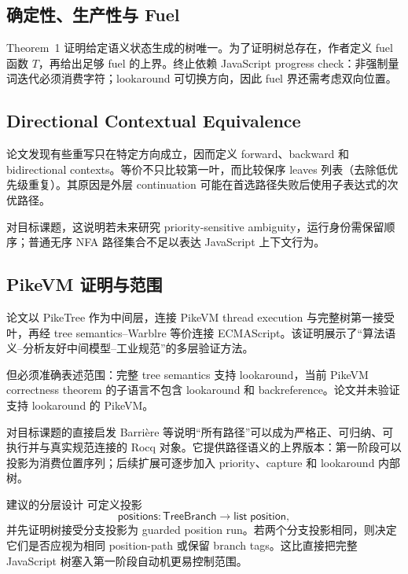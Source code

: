 \documentclass[UTF8,a4paper,12pt]{ctexart}
\begin{document}
\subsection{确定性、生产性与 Fuel}

Theorem~1 证明给定语义状态生成的树唯一。为了证明树总存在，作者定义 fuel 函数 $T$，再给出足够 fuel 的上界。终止依赖 JavaScript progress check：非强制量词迭代必须消费字符；lookaround 可切换方向，因此 fuel 界还需考虑双向位置\cite[p.~9]{barriere2026}。

\subsection{Directional Contextual Equivalence}

论文发现有些重写只在特定方向成立，因而定义 forward、backward 和 bidirectional contexts。等价不只比较第一叶，而比较保序 leaves 列表（去除低优先级重复）。其原因是外层 continuation 可能在首选路径失败后使用子表达式的次优路径。

对目标课题，这说明若未来研究 priority-sensitive ambiguity，运行身份需保留顺序；普通无序 NFA 路径集合不足以表达 JavaScript 上下文行为。

\subsection{PikeVM 证明与范围}

论文以 PikeTree 作为中间层，连接 PikeVM thread execution 与完整树第一接受叶，再经 tree semantics--Warblre 等价连接 ECMAScript。该证明展示了“算法语义--分析友好中间模型--工业规范”的多层验证方法。

但必须准确表述范围：完整 tree semantics 支持 lookaround，当前 PikeVM correctness theorem 的子语言不包含 lookaround 和 backreference。论文并未验证支持 lookaround 的 PikeVM。

\begin{directlink}{对目标课题的直接启发}
Barri\`ere 等说明“所有路径”可以成为严格正、可归纳、可执行并与真实规范连接的 Rocq 对象。它提供路径语义的上界版本：第一阶段可以投影为消费位置序列；后续扩展可逐步加入 priority、capture 和 lookaround 内部树。
\end{directlink}

\begin{coqbox}{建议的分层设计}
可定义投影
\[
\mathsf{positions}:\mathsf{TreeBranch}\to\mathsf{list}\;\mathsf{position},
\]
并先证明树接受分支投影为 guarded position run。若两个分支投影相同，则决定它们是否应视为相同 position-path 或保留 branch tags。这比直接把完整 JavaScript 树塞入第一阶段自动机更易控制范围。
\end{coqbox}
\end{document}
